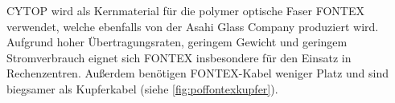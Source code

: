 CYTOP\textsuperscript{\texttrademark} wird als Kernmaterial für die polymer
optische Faser FONTEX\textsuperscript{\texttrademark} verwendet, welche
ebenfalls von der Asahi Glass Company produziert wird. Aufgrund hoher
Übertragungsraten, geringem Gewicht und geringem Stromverbrauch eignet sich
FONTEX\textsuperscript{\texttrademark} insbesondere für den Einsatz in
Rechenzentren. Außerdem benötigen FONTEX\textsuperscript{\texttrademark}-Kabel
weniger Platz und sind biegsamer als Kupferkabel (siehe
\autoref{fig:poffontexkupfer}). \cite{poffontex}
